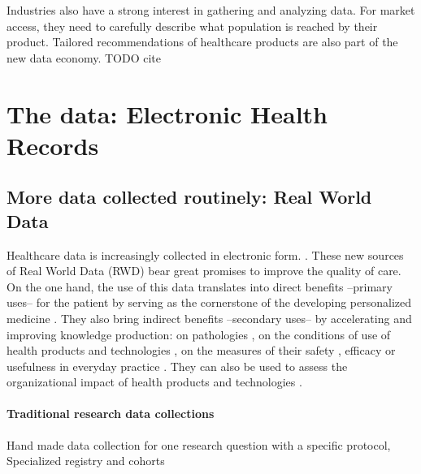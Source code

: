 \documentclass[french,12pt,twoside,a4paper]{book}
\begin{document}
Industries also have a strong interest in gathering and analyzing data. For
market access, they need to carefully describe what population is reached by
their product. Tailored recommendations of healthcare products are also part of
the new data economy. TODO cite

\section{The data: Electronic Health Records}\label{sec:intro:data}

\begin{background_box_left}

  \subsection{More data collected routinely: Real World Data}\label{subsec:intro:real_world_data}

  Healthcare data is increasingly collected in electronic form.
  \citep{jha_use_2009,sheikh_adoption_2014,kim_rate_2017,esdar_diffusion_2019,kanakubo_comparing_2019,liang_adoption_2021,apathy_decade_2021}.
  These new sources of Real World Data (RWD) \citep{fda_real-world_2021} bear
  great promises to improve the quality of care. On the one hand, the use of this
  data translates into direct benefits --primary uses-- for the patient by serving
  as the cornerstone of the developing personalized medicine
  \citep{mann_artificial_2022,ziegler_high_2022}. They also bring indirect
  benefits --secondary uses-- by accelerating and improving knowledge production:
  on pathologies \citep{campbell_characterizing_2022}, on the conditions of use of
  health products and technologies \citep{safran_toward_2007,tuppin_value_2017}, on
  the measures of their safety \citep{wisniewski_development_2003}, efficacy or
  usefulness in everyday practice \citep{richesson_electronic_2013}. They can also
  be used to assess the organizational impact of health products and technologies
  \citep{has_guide_2020,has_real-world_2021}.



  \paragraph{Traditional research data collections}

  Hand made data collection for one research question with a specific protocol,
  Specialized registry and cohorts



\end{background_box_left}
\end{document}
